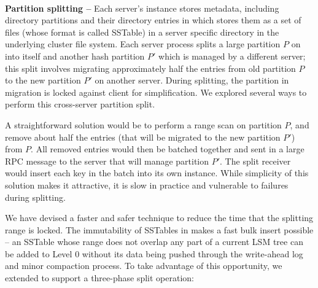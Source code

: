 ~\\
\textbf{Partition splitting -- }
Each server's \tfs instance stores metadata,
including \giga directory partitions and their directory
entries in \ldb which stores them as
a set of files (whose format is called SSTable) in a server specific directory
in the underlying cluster file system.
Each \giga server process splits a large partition $P$ on
into itself and another hash partition $P'$ which is managed by a
different server; this split involves migrating approximately half the entries
from old partition $P$ to the new partition $P'$ on another server.
During splitting, the partition in migration is locked against client
for simplification. We explored several ways
to perform this cross-server partition split.

A straightforward solution would be to perform a range scan on
partition $P$, and remove about half the entries
(that will be migrated to the new partition $P'$) from $P$.
All removed entries would then be batched together
and sent in a large RPC message to the server that will manage partition $P'$.
The split receiver would insert each key in the batch into its own \tfs instance.
While simplicity of this solution makes it attractive,
it is slow in practice and vulnerable to failures during splitting.

We have devised a faster and safer technique to
reduce the time that the splitting range is locked.
The immutability of SSTables in \ldb makes a fast bulk insert possible --
an SSTable whose range does not overlap any part of a current LSM tree
can be added to Level 0 without its data being pushed through the
write-ahead log and minor compaction process.
To take advantage of this opportunity, we extended \tfs
to support a three-phase \giga split operation:

